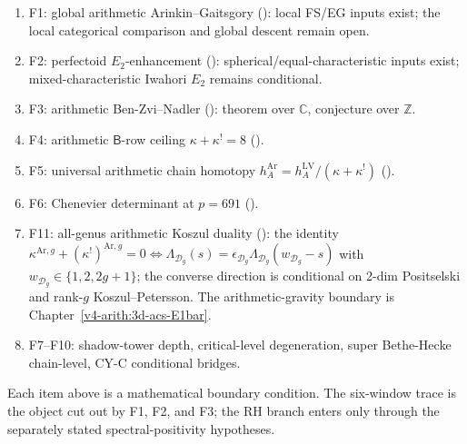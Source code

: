 \begin{enumerate}
\item F1: global arithmetic Arinkin--Gaitsgory
(): local FS/EG inputs exist; the
local categorical comparison and global descent remain open.
\item F2: perfectoid \(E_{2}\)-enhancement
(): spherical/equal-characteristic
inputs exist; mixed-characteristic Iwahori \(E_{2}\) remains
conditional.
\item F3: arithmetic Ben-Zvi--Nadler
(): theorem over \(\mathbb{C}\),
conjecture over \(\mathbb{Z}\).
\item F4: arithmetic \(\mathsf{B}\)-row ceiling \(\kappa+\kappa^{!}=8\)
().
\item F5: universal arithmetic chain homotopy
\(h^{\mathrm{Ar}}_{A}=h^{\mathrm{LV}}_{A}/(\kappa+\kappa^{!})\)
().
\item F6: Chenevier determinant at \(p=691\)
().
\item F11: all-genus arithmetic Koszul duality
(): the identity
\(\kappa^{\mathrm{Ar},g}+(\kappa^{!})^{\mathrm{Ar},g}=0\Leftrightarrow\Lambda_{\mathcal{D}_g}(s)=\epsilon_{\mathcal{D}_g}\Lambda_{\mathcal{D}_g}(w_{\mathcal{D}_g}-s)\)
with \(w_{\mathcal{D}_g}\in\{1,2,2g+1\}\); the converse direction is
conditional on 2-dim Positselski and rank-\(g\)
Koszul--Petersson. The arithmetic-gravity boundary is
Chapter~\ref{v4-arith:3d-acs-E1bar}.
\item F7--F10: shadow-tower depth, critical-level degeneration,
super Bethe-Hecke chain-level, CY-C conditional bridges.
\end{enumerate}

Each item above is a mathematical boundary condition. The six-window
trace is the object cut out by F1, F2, and F3; the RH branch enters
only through the separately stated spectral-positivity hypotheses.

